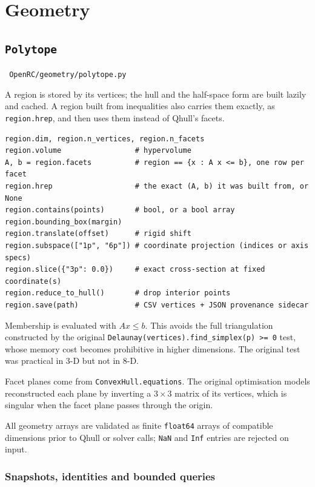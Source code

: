 \documentclass[11pt,a4paper]{report}
\newcommand{\why}[1]{\par\medskip\begingroup\noindent #1\par\endgroup\medskip}
\newcommand{\code}[1]{\texttt{\small #1}}
\newcommand{\file}[1]{\texttt{\small\color{nbgrey} #1}}
\begin{document}
\chapter{Geometry}
\label{ch:geometry}

\section{\code{Polytope}}

\file{OpenRC/geometry/polytope.py}

A region is stored by its vertices; the hull and the half-space form are built
lazily and cached. A region built from inequalities also carries them exactly,
as \code{region.hrep}, and then uses them instead of Qhull's facets.

\begin{lstlisting}
region.dim, region.n_vertices, region.n_facets
region.volume                 # hypervolume
A, b = region.facets          # region == {x : A x <= b}, one row per facet
region.hrep                   # the exact (A, b) it was built from, or None
region.contains(points)       # bool, or a bool array
region.bounding_box(margin)
region.translate(offset)      # rigid shift
region.subspace(["1p", "6p"]) # coordinate projection (indices or axis specs)
region.slice({"3p": 0.0})     # exact cross-section at fixed coordinate(s)
region.reduce_to_hull()       # drop interior points
region.save(path)             # CSV vertices + JSON provenance sidecar
\end{lstlisting}

\why{Membership is evaluated with $Ax \le b$. This avoids the full
triangulation constructed by the original
\code{Delaunay(vertices).find\_simplex(p) >= 0} test, whose memory cost becomes
prohibitive in higher dimensions. The original test was practical in 3-D but
not in 8-D.}

\why{Facet planes come from \code{ConvexHull.equations}. The original
optimisation models reconstructed each plane by inverting a $3\times3$ matrix of its
vertices, which is singular when the facet plane passes through the
origin.}

All geometry arrays are validated as finite \code{float64} arrays of compatible
dimensions prior to Qhull or solver calls; \code{NaN} and \code{Inf} entries
are rejected on input.

\subsection{Snapshots, identities and bounded queries}
\end{document}
